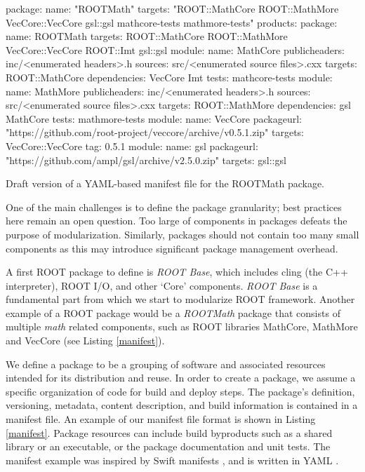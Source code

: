 \documentclass{webofc}
\begin{document}
\begin{listing}[h]
\noindent
\begin{minipage}[h]{.7\textwidth}

\begin{cppcode*}{}
  package:
    name: "ROOTMath"
    targets: "ROOT::MathCore ROOT::MathMore VecCore::VecCore gsl::gsl mathcore-tests 
            mathmore-tests"
    products:
      package:
      name: ROOTMath
      targets: ROOT::MathCore ROOT::MathMore VecCore::VecCore ROOT::Imt gsl::gsl
    module:
      name: MathCore
      publicheaders: inc/<enumerated headers>.h
      sources: src/<enumerated source files>.cxx
      targets: ROOT::MathCore
      dependencies: VecCore Imt
      tests: mathcore-tests
    module:
      name: MathMore
      publicheaders: inc/<enumerated headers>.h
      sources: src/<enumerated source files>.cxx
      targets: ROOT::MathMore
      dependencies: gsl MathCore
      tests: mathmore-tests
    module:
      name: VecCore
      packageurl: "https://github.com/root-project/veccore/archive/v0.5.1.zip"
      targets: VecCore::VecCore
      tag: 0.5.1
    module:
      name: gsl
      packageurl: "https://github.com/ampl/gsl/archive/v2.5.0.zip"
      targets: gsl::gsl
 \end{cppcode*}
 \end{minipage}
 \caption{Draft version of a YAML-based manifest file for the ROOTMath package.}
 \label{manifest}
\end{listing}


One of the main challenges is to define the package granularity; best practices here remain an open question.  Too large of components in packages defeats the purpose of modularization. Similarly, packages should not contain too many small components as this may introduce significant package management overhead.

A first ROOT package to define is \textit{ROOT Base}, which includes cling (the C++ interpreter), ROOT I/O, and other `Core' components.  \textit{ROOT Base} is a fundamental part from which we start to modularize ROOT framework. Another example of a ROOT package would be a  \textit{ROOTMath} package that consists of multiple  \textit{math} related components, such as ROOT libraries MathCore, MathMore and VecCore (see Listing \ref{manifest}). %

We define a package to be a grouping of software and associated resources intended for its distribution and reuse. In order to create a package, we assume a specific organization of code for build and deploy steps. The package's definition, versioning, metadata, content description, and build information is contained in a manifest file.  An example of our manifest file format is shown in Listing \ref{manifest}.  Package resources can include build byproducts such as a shared library or an executable, or the package documentation and unit tests.
The manifest example was inspired by Swift manifests \cite{swift}, and is written in YAML \cite{yaml}.
\end{document}
